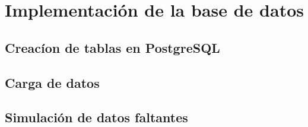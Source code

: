 \section{Implementación de la base de datos}
\subsection{Creacíon de tablas en PostgreSQL}
\subsection{Carga de datos}
\subsection{Simulación de datos faltantes}